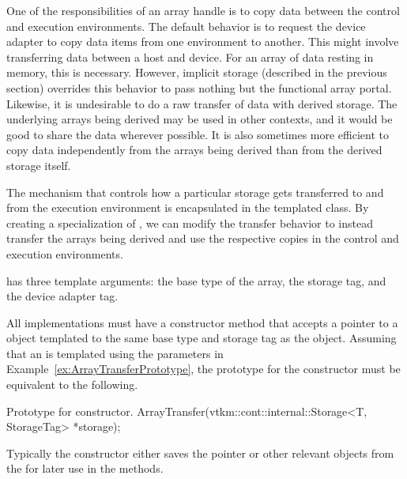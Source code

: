 One of the responsibilities of an array handle is to copy data between the
control and execution environments. The default behavior is to request the
device adapter to copy data items from one environment to another. This
might involve transferring data between a host and device. For an array of
data resting in memory, this is necessary. However, implicit storage
(described in the previous section) overrides this behavior to pass nothing
but the functional array portal. Likewise, it is undesirable to do a raw
transfer of data with derived storage. The underlying arrays being
derived may be used in other contexts, and it would be good to share the
data wherever possible. It is also sometimes more efficient to copy data
independently from the arrays being derived than from the derived storage
itself.


The mechanism that controls how a particular storage gets
transferred to and from the execution environment is encapsulated in the
templated  class. By creating a
specialization of , we can modify the
transfer behavior to instead transfer the arrays being derived and use the
respective copies in the control and execution environments.

 has three template arguments: the base type
of the array, the storage tag, and the device adapter tag.


All  implementations must have a
constructor method that accepts a pointer to a 
object templated to the same base type and storage tag as the
 object. Assuming that an
 is templated using the parameters in
Example~\ref{ex:ArrayTransferPrototype}, the prototype for the constructor
must be equivalent to the following.
\begin{vtkmexample}{Prototype for  constructor.}
ArrayTransfer(vtkm::cont::internal::Storage<T, StorageTag> *storage);
\end{vtkmexample}
Typically the constructor either saves the  pointer
or other relevant objects from the  for later use in
the methods.

